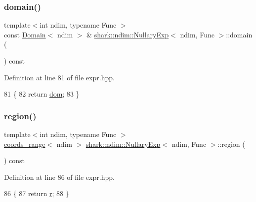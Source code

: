 \subsubsection{\texorpdfstring{domain()}{domain()}}
{\footnotesize\ttfamily template$<$int ndim, typename Func $>$ \\
const \hyperlink{classshark_1_1ndim_1_1_domain}{Domain}$<$ ndim $>$ \& \hyperlink{classshark_1_1ndim_1_1_nullary_exp}{shark\+::ndim\+::\+Nullary\+Exp}$<$ ndim, Func $>$\+::domain (\begin{DoxyParamCaption}{ }\end{DoxyParamCaption}) const\hspace{0.3cm}{\ttfamily [inline]}}



Definition at line 81 of file expr.\+hpp.


\begin{DoxyCode}
81                                                                        \{
82             \textcolor{keywordflow}{return} \hyperlink{classshark_1_1ndim_1_1_nullary_exp_a4af666c034e0035ca4a9c4f8cf2f2ea2}{dom};
83         \}
\end{DoxyCode}
\hypertarget{classshark_1_1ndim_1_1_nullary_exp_a82f2b29d4412c95428e1eda9ff454cf6}{}\label{classshark_1_1ndim_1_1_nullary_exp_a82f2b29d4412c95428e1eda9ff454cf6} 
\subsubsection{\texorpdfstring{region()}{region()}}
{\footnotesize\ttfamily template$<$int ndim, typename Func $>$ \\
\hyperlink{structshark_1_1ndim_1_1coords__range}{coords\+\_\+range}$<$ ndim $>$ \hyperlink{classshark_1_1ndim_1_1_nullary_exp}{shark\+::ndim\+::\+Nullary\+Exp}$<$ ndim, Func $>$\+::region (\begin{DoxyParamCaption}{ }\end{DoxyParamCaption}) const\hspace{0.3cm}{\ttfamily [inline]}}



Definition at line 86 of file expr.\+hpp.


\begin{DoxyCode}
86                                                                       \{
87             \textcolor{keywordflow}{return} \hyperlink{classshark_1_1ndim_1_1_nullary_exp_a2ab3c895de1618318f8864c90cd7b21e}{r};
88         \}
\end{DoxyCode}


